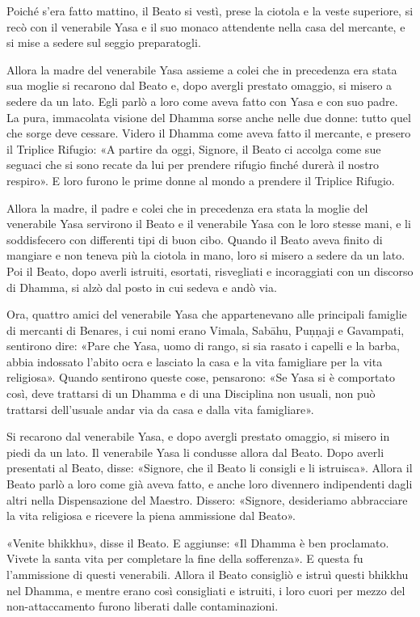 Poiché s’era fatto mattino, il Beato si vestì, prese la ciotola e la veste
superiore, si recò con il venerabile Yasa e il suo monaco attendente nella casa
del mercante, e si mise a sedere sul seggio preparatogli.

Allora la madre del venerabile Yasa assieme a colei che in precedenza era stata
sua moglie si recarono dal Beato e, dopo avergli prestato omaggio, si misero a
sedere da un lato. Egli parlò a loro come aveva fatto con Yasa e con suo padre.
La pura, immacolata visione del Dhamma sorse anche nelle due donne: tutto quel
che sorge deve cessare. Videro il Dhamma come aveva fatto il mercante, e presero
il Triplice Rifugio: «A partire da oggi, Signore, il Beato ci accolga come sue
seguaci che si sono recate da lui per prendere rifugio finché durerà il nostro
respiro». E loro furono le prime donne al mondo a prendere il Triplice Rifugio.

Allora la madre, il padre e colei che in precedenza era stata la moglie del
venerabile Yasa servirono il Beato e il venerabile Yasa con le loro stesse mani,
e li soddisfecero con differenti tipi di buon cibo. Quando il Beato aveva finito
di mangiare e non teneva più la ciotola in mano, loro si misero a sedere da un
lato. Poi il Beato, dopo averli istruiti, esortati, risvegliati e incoraggiati
con un discorso di Dhamma, si alzò dal posto in cui sedeva e andò via.

Ora, quattro amici del venerabile Yasa che appartenevano alle principali
famiglie di mercanti di Benares, i cui nomi erano Vimala, Sabāhu, Puṇṇaji e
Gavampati, sentirono dire: «Pare che Yasa, uomo di rango, si sia rasato i
capelli e la barba, abbia indossato l’abito ocra e lasciato la casa e la vita
famigliare per la vita religiosa». Quando sentirono queste cose, pensarono: «Se
Yasa si è comportato così, deve trattarsi di un Dhamma e di una Disciplina non
usuali, non può trattarsi dell’usuale andar via da casa e dalla vita
famigliare».

Si recarono dal venerabile Yasa, e dopo avergli prestato omaggio, si misero in
piedi da un lato. Il venerabile Yasa li condusse allora dal Beato. Dopo averli
presentati al Beato, disse: «Signore, che il Beato li consigli e li istruisca».
Allora il Beato parlò a loro come già aveva fatto, e anche loro divennero
indipendenti dagli altri nella Dispensazione del Maestro. Dissero: «Signore,
desideriamo abbracciare la vita religiosa e ricevere la piena ammissione dal
Beato».

«Venite bhikkhu», disse il Beato. E aggiunse: «Il Dhamma è ben proclamato.
Vivete la santa vita per completare la fine della sofferenza». E questa fu
l’ammissione di questi venerabili. Allora il Beato consigliò e istruì questi
bhikkhu nel Dhamma, e mentre erano così consigliati e istruiti, i loro cuori per
mezzo del non-attaccamento furono liberati dalle contaminazioni.

